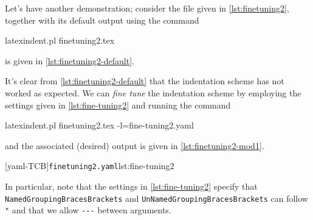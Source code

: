 \documentclass[10pt]{article}
\begin{document}
 \begin{example}
 Let's have another demonstration; consider the file given in \cref{lst:finetuning2},
 together with its default output using the command

 \begin{commandshell}
latexindent.pl finetuning2.tex 
\end{commandshell}

 is given in \cref{lst:finetuning2-default}.

 \begin{cmhtcbraster}[raster column skip=.01\linewidth,
   raster left skip=-3.75cm,
   raster right skip=0cm,]
 \end{cmhtcbraster}

 It's clear from \cref{lst:finetuning2-default} that the indentation scheme has not
 worked as expected. We can \emph{fine tune} the indentation scheme by employing the
 settings given in \cref{lst:fine-tuning2} and running the command 

 \begin{commandshell}
latexindent.pl finetuning2.tex -l=fine-tuning2.yaml
\end{commandshell}

 and the associated (desired) output is given in \cref{lst:finetuning2-mod1}.

 \begin{cmhtcbraster}[raster column skip=.01\linewidth,
   raster left skip=-3.75cm,
   raster right skip=0cm,]
  [yaml-TCB]{\texttt{finetuning2.yaml}}{lst:fine-tuning2}
 \end{cmhtcbraster}

 In particular, note that the settings in \cref{lst:fine-tuning2} specify that
 \texttt{NamedGroupingBracesBrackets} and \texttt{UnNamedGroupingBracesBrackets} can
 follow \texttt{"} and that we allow \lstinline!---! between arguments.
 \end{example}
\end{document}
